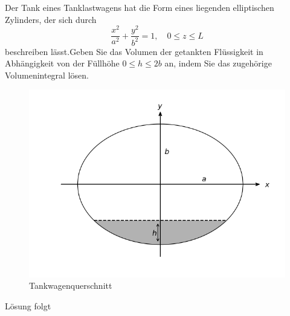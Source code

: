 \documentclass{atistandalonetask}
\begin{document}
  \begin{atiTask}[
    title = Füllung eines Tankwagens
  ]
  
  Der Tank eines Tanklastwagens hat die Form eines liegenden elliptischen Zylinders, der sich durch
  \[
  \frac{x^2}{a^2}+\frac{y^2}{b^2}=1,\quad 0\leq z\leq L
  \]
  beschreiben lässt.Geben Sie das Volumen der getankten Flüssigkeit in Abhängigkeit von der Füllhöhe $0\leq h\leq 2b$ an, indem Sie das zugehörige Volumenintegral lösen.
  \begin{figure}[H]
\centering
\includegraphics[width=0.7\linewidth]{./picture-doppelintegral_iii}
\caption{Tankwagenquerschnitt}

\end{figure}

  	
  \end{atiTask}
  \begin{atiSolution}
   	Lösung folgt
  \end{atiSolution}
\end{document}

